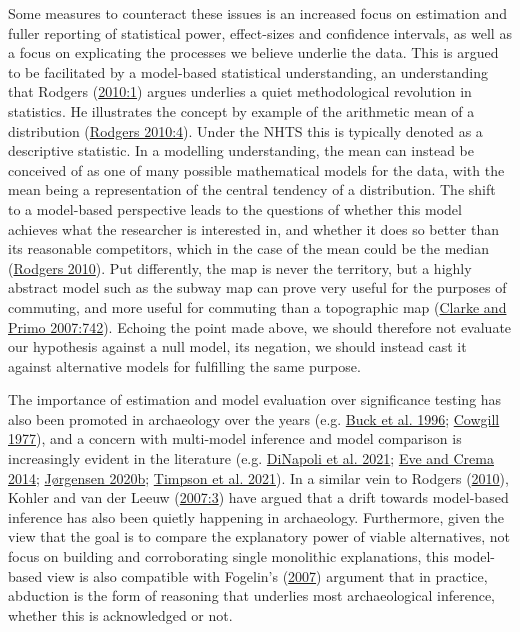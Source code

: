 \documentclass[
  12pt,
  a4paper,
  oneside]{book}
\begin{document}
Some measures to counteract these issues is an increased focus on estimation and fuller reporting of statistical power, effect-sizes and confidence intervals, as well as a focus on explicating the processes we believe underlie the data. This is argued to be facilitated by a model-based statistical understanding, an understanding that Rodgers (\protect\hyperlink{ref-rodgers2010}{2010:1}) argues underlies a \textquotesingle quiet methodological revolution\textquotesingle{} in statistics. He illustrates the concept by example of the arithmetic mean of a distribution (\protect\hyperlink{ref-rodgers2010}{Rodgers 2010:4}). Under the NHTS this is typically denoted as a descriptive statistic. In a modelling understanding, the mean can instead be conceived of as one of many possible mathematical models for the data, with the mean being a representation of the central tendency of a distribution. The shift to a model-based perspective leads to the questions of whether this model achieves what the researcher is interested in, and whether it does so better than its reasonable competitors, which in the case of the mean could be the median (\protect\hyperlink{ref-rodgers2010}{Rodgers 2010}). Put differently, the map is never the territory, but a highly abstract model such as the subway map can prove very useful for the purposes of commuting, and more useful for commuting than a topographic map (\protect\hyperlink{ref-clarke2007}{Clarke and Primo 2007:742}). Echoing the point made above, we should therefore not evaluate our hypothesis against a null model, its negation, we should instead cast it against alternative models for fulfilling the same purpose.

The importance of estimation and model evaluation over significance testing has also been promoted in archaeology over the years (e.g. \protect\hyperlink{ref-buck1996}{Buck et al. 1996}; \protect\hyperlink{ref-cowgill1977}{Cowgill 1977}), and a concern with multi-model inference and model comparison is increasingly evident in the literature (e.g. \protect\hyperlink{ref-dinapoli2021}{DiNapoli et al. 2021}; \protect\hyperlink{ref-eve2014}{Eve and Crema 2014}; \protect\hyperlink{ref-jorgensen2020c}{Jørgensen 2020b}; \protect\hyperlink{ref-timpson2021}{Timpson et al. 2021}). In a similar vein to Rodgers (\protect\hyperlink{ref-rodgers2010}{2010}), Kohler and van der Leeuw (\protect\hyperlink{ref-kohler2007}{2007:3}) have argued that a drift towards model-based inference has also been quietly happening in archaeology. Furthermore, given the view that the goal is to compare the explanatory power of viable alternatives, not focus on building and corroborating single monolithic explanations, this model-based view is also compatible with Fogelin's (\protect\hyperlink{ref-fogelin2007}{2007}) argument that in practice, abduction is the form of reasoning that underlies most archaeological inference, whether this is acknowledged or not.
\end{document}
